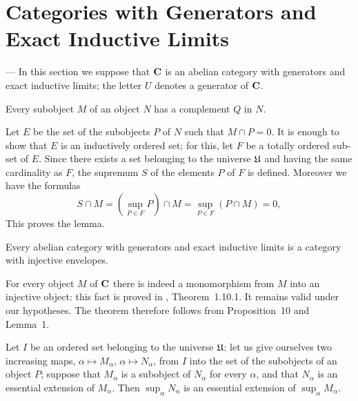 %
%

\section{Categories with Generators and Exact Inductive Limits}

--- In this section we suppose that $\mathbf{C}$ is an abelian category with
generators and exact inductive limits; the letter $U$ denotes a generator of
$\mathbf{C}$.

\begin{lemma}
Every subobject $M$ of an object $N$ has a complement $Q$ in $N$.
\end{lemma}

Let $E$ be the set of the subobjects $P$ of $N$ such that $M \cap P = 0$. It
is enough to show that $E$ is an inductively ordered set; for this, let $F$ be
a totally ordered sub-set of $E$. Since there exists a set belonging to the
universe $\mathfrak{U}$ and having the same cardinality as $F$, the supremum $S$ of
the elements $P$ of $F$ is defined. Moreover we have the formulas
\[
  S \cap M = \left(\sup_{P \in F} P\right) \cap M
           = \sup_{P \in F}\left(P \cap M\right) = 0,
\]
This proves the lemma.

\begin{theorem}
Every abelian category with generators and exact inductive limits is a category
with injective envelopes.
\end{theorem}

For every object $M$ of $\mathbf{C}$ there is indeed a monomorphism from $M$ into an
injective object: this fact is proved in \cite{grothendieck-1}, Theorem~1.10.1. It remains valid
under our hypotheses. The theorem therefore follows from Proposition~10 and
Lemma~1.

\begin{proposition}
Let $I$ be an ordered set belonging to the universe $\mathfrak{U}$; let us give
ourselves two increasing maps, $\alpha \mapsto M_\alpha$,
$\alpha \mapsto N_\alpha$, from $I$ into the set of the subobjects of an object
$P$; suppose that $M_\alpha$ is a subobject of $N_\alpha$ for every $\alpha$,
and that $N_\alpha$ is an essential extension of $M_\alpha$. Then
$\sup_\alpha N_\alpha$ is an essential extension of $\sup_\alpha M_\alpha$.
\end{proposition}

